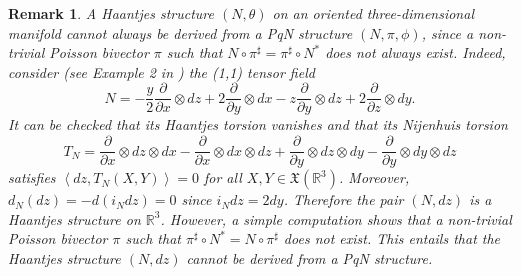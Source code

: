 \documentclass[12pt]{article}
\newtheorem{remark}[theorem]{Remark}
\begin{document}
\begin{remark}
\label{rem:Eber}
A Haantjes structure $(N,\theta)$ on an oriented three-dimensional manifold cannot always be derived from a PqN structure $(N,\pi,\phi)$, since a non-trivial Poisson bivector $\pi$ such that  $N\circ\pi^{\sharp}=\pi^{\sharp}\circ N^*$ does not always exist. Indeed, consider 
(see Example 2 in \cite{MagriVeselov}) the (1,1) tensor field
\[
N=-\frac{y}{2}\frac{\partial}{\partial x}\otimes dz+2\frac{\partial}{\partial y}\otimes dx-z\frac{\partial}{\partial y}\otimes dz+2\frac{\partial}{\partial z}\otimes dy.
\]
It can be checked that its Haantjes torsion vanishes and that its Nijenhuis torsion
\[
T_N=\frac{\partial}{\partial x}\otimes dz\otimes dx-\frac{\partial}{\partial x}\otimes dx\otimes dz+\frac{\partial}{\partial y}\otimes dz\otimes dy-\frac{\partial}{\partial y}\otimes dy\otimes dz
\]
satisfies $\left<dz,T_N(X,Y)\right>=0$ for all $X,Y\in \mathfrak{X}(\mathbb R^3)$. Moreover,  $d_N(dz)=-d(i_Ndz)=0$ since $i_Ndz=2dy$. 
Therefore the pair $(N,dz)$ is a Haantjes structure on $\mathbb R^3$. 
However, a simple computation shows that a non-trivial Poisson bivector $\pi$ such that 
$\pi^{\sharp}\circ N^*=N\circ \pi^{\sharp}$ does not exist.
This entails that the Haantjes structure $(N,dz)$ cannot be derived from a PqN structure.
\end{remark}
\end{document}
